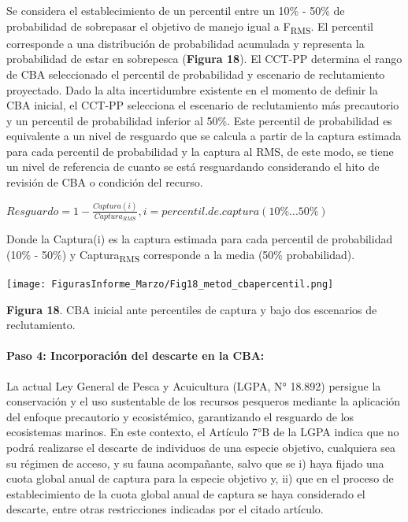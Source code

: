 \documentclass[
  spanish,
]{article}
\begin{document}
Se considera el establecimiento de un percentil entre un 10\% - 50\% de
probabilidad de sobrepasar el objetivo de manejo igual a
F\textsubscript{RMS}. El percentil corresponde a una distribución de
probabilidad acumulada y representa la probabilidad de estar en
sobrepesca (\textbf{Figura 18}). El CCT-PP determina el rango de CBA
seleccionado el percentil de probabilidad y escenario de reclutamiento
proyectado. Dado la alta incertidumbre existente en el momento de
definir la CBA inicial, el CCT-PP selecciona el escenario de
reclutamiento más precautorio y un percentil de probabilidad inferior al
50\%. Este percentil de probabilidad es equivalente a un nivel de
resguardo que se calcula a partir de la captura estimada para cada
percentil de probabilidad y la captura al RMS, de este modo, se tiene un
nivel de referencia de cuanto se está resguardando considerando el hito
de revisión de CBA o condición del recurso.

\vspace{0.5cm}
\large
\begin{center} 
$Resguardo = 1-\frac{Captura(i)}{Captura_{RMS}}, i = percentil.de.captura (10\% ...50\%)$
\end{center}
\vspace{0.5cm}

\normalsize

Donde la Captura(i) es la captura estimada para cada percentil de
probabilidad (10\% - 50\%) y Captura\textsubscript{RMS} corresponde a la
media (50\% probabilidad).

\begin{center}
\texttt{[image: FigurasInforme\_Marzo/Fig18\_metod\_cbapercentil.png]}
\end{center}

\small

\textbf{Figura 18}. CBA inicial ante percentiles de captura y bajo dos
escenarios de reclutamiento. \vspace{0.5cm} \normalsize

\hypertarget{paso-4-incorporaciuxf3n-del-descarte-en-la-cba}{%
\paragraph{Paso 4: Incorporación del descarte en la
CBA:}\label{paso-4-incorporaciuxf3n-del-descarte-en-la-cba}}

La actual Ley General de Pesca y Acuicultura (LGPA, N° 18.892) persigue
la conservación y el uso sustentable de los recursos pesqueros mediante
la aplicación del enfoque precautorio y ecosistémico, garantizando el
resguardo de los ecosistemas marinos. En este contexto, el Artículo 7°B
de la LGPA indica que no podrá realizarse el descarte de individuos de
una especie objetivo, cualquiera sea su régimen de acceso, y su fauna
acompañante, salvo que se i) haya fijado una cuota global anual de
captura para la especie objetivo y, ii) que en el proceso de
establecimiento de la cuota global anual de captura se haya considerado
el descarte, entre otras restricciones indicadas por el citado artículo.
\end{document}
